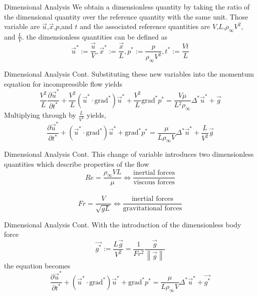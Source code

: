 \documentclass[frames]{prosper}
\begin{document}
\begin{slide}[Dissolve]{Dimensional Analysis}
We obtain a dimensionless quantity by taking the ratio of the dimensional quantity over the reference quantity with the same unit.
Those variable are $\stackrel{\rightarrow}{u}$,$\stackrel{\rightarrow}{x}$,$p$,and $t$ and the associated reference quantities are $V$,$L$,$\rho_{\infty}V^2$, and $\displaystyle{\frac{L}{V}}$.
the dimensionless quantities can be defined as $$\stackrel{\rightarrow}{u}^* := \frac{\stackrel{\rightarrow}{u}}{V}, \stackrel{\rightarrow}{x}^* := \frac{\stackrel{\rightarrow}{x}}{L}, p^* := \frac{p}{\rho_{\infty}V^2}, t^* := \frac{Vt}{L}$$
\end{slide}

\begin{slide}[Dissolve]{Dimensional Analysis Cont.}
Substituting  these new variables into the momentum equation for incompressible flow yields
$$\frac{V^2}{L}\frac{\partial \stackrel{\rightarrow}{u}^*}{\partial t^*} + \frac{V^2}{L}(\stackrel{\rightarrow}{u}^* \cdot \mbox{grad}^*)\stackrel{\rightarrow}{u}^* + \frac{V^2}{L}\mbox{grad}^* p^* = \frac{V\mu}{L{^2}\rho_{\infty}} \Delta^* \stackrel{\rightarrow}{u}^* + \stackrel{\rightarrow}{g}$$
Multiplying through by $\displaystyle{\frac{L}{V^2}}$ yields, $$\frac{\partial \stackrel{\rightarrow}{u}^*}{\partial t^*} + (\stackrel{\rightarrow}{u}^* \cdot \mbox{grad}^*)\stackrel{\rightarrow}{u}^* + \mbox{grad}^* p^* = \frac{\mu}{L\rho_{\infty}V} \Delta^* \stackrel{\rightarrow}{u}^* + \frac{L}{V^2} \stackrel{\rightarrow}{g}$$
\end{slide}

\begin{slide}[Dissolve]{Dimensional Analysis Cont.}
This change of variable introduces two dimensionless quantities which describe properties of the flow
$$Re = \frac{\rho_{\infty}VL}{\mu} \Leftrightarrow \frac{\mbox{inertial forces}}{\mbox{viscous forces}}$$\\
$$Fr = \frac{V}{\sqrt{gL}} \Leftrightarrow \frac{\mbox{inertial forces}}{\mbox{gravitational forces}}$$
\end{slide}

\begin{slide}[Dissolve]{Dimensional Analysis Cont.}
With the introduction of the dimensionless body force $$ \stackrel{\rightarrow}{g^{*}} := \frac{L \stackrel{\rightarrow}{g}}{V^2} = \frac{1}{Fr^2}\frac{\stackrel{\rightarrow}{g}}{\left\|\stackrel{\rightarrow}{g}\right\|} $$ the equation becomes $$ \frac{\partial \stackrel{\rightarrow}{u}^*}{\partial t^*} + (\stackrel{\rightarrow}{u}^* \cdot \mbox{grad}^*)\stackrel{\rightarrow}{u}^* + \mbox{grad}^* p^* = \frac{\mu}{L\rho_{\infty}V} \Delta^* \stackrel{\rightarrow}{u}^* + \stackrel{\rightarrow}{g^{*}} $$
\end{slide}
\end{document}
